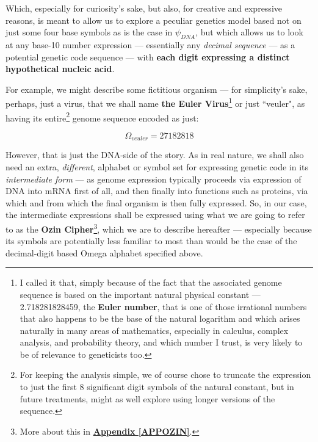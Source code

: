 \documentclass[a4paper, 18pt]{book} %
\begin{document}
Which, especially for curiosity's sake, but also, for creative and expressive reasons, is meant to allow us to explore a peculiar genetics model based not on just some four base symbols as is the case in $\psi_{DNA}$, but which allows us to look at any base-10 number expression --- essentially any \textit{decimal sequence} --- as a potential genetic code sequence --- with \textbf{each digit expressing a distinct hypothetical nucleic acid}. 


For example, we might describe some fictitious organism --- for simplicity's sake, perhaps, just a virus, that we shall name \textbf{the Euler Virus}\footnote{I called it that, simply because of the fact that the associated genome sequence is based on the important natural physical constant --- 2.718281828459, the \textbf{Euler number}, that is one of those irrational numbers that also happens to be the base of the natural logarithm and which arises naturally in many areas of mathematics, especially in calculus, complex analysis, and probability theory, and which number I trust, is very likely to be of relevance to geneticists too.} or just ``veuler", as having its entire\footnote{For keeping the analysis simple, we of course chose to truncate the expression to just the first 8 significant digit symbols of the natural constant, but in future treatments, might as well explore using longer versions of the sequence.} genome sequence encoded as just:

\vspace{1em}
\begin{equation}
\label{EQDNAV}
\Omega_{veuler} = 27182818
\end{equation}
\vspace{1em}


However, that is just the DNA-side of the story. As in real nature, we shall also need an extra, \textit{different}, alphabet or symbol set for expressing genetic code in its \textit{intermediate form} --- as genome expression typically proceeds via expression of DNA into mRNA first of all, and then finally into functions such as proteins, via which and from which the final organism is then fully expressed. So, in our case, the intermediate expressions shall be expressed using what we are going to refer to as the \textbf{Ozin Cipher}\footnote{More about this in  \textbf{\hyperref[APPOZIN]{Appendix \ref{APPOZIN}}}.}, which we are to describe hereafter --- especially because its symbols are potentially less familiar to most than would be the case of the decimal-digit based Omega alphabet specified above.
\end{document}
